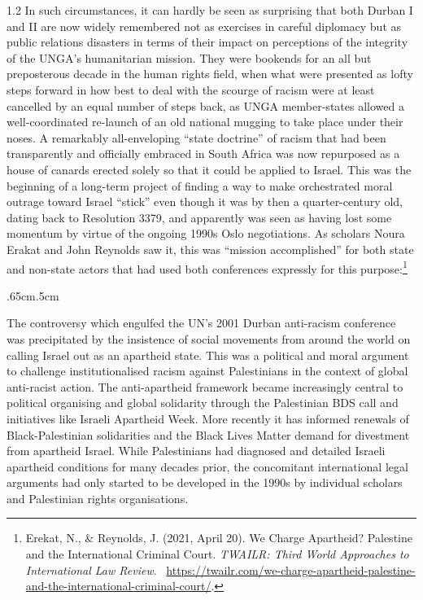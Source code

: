 \documentclass[../unravbook.tex]{subfiles}
\begin{document}
\begin{spacing}{1.2}
In such circumstances, it can hardly be seen as surprising that both Durban I and II are now widely remembered not as exercises in careful diplomacy but as public relations disasters in terms of their impact on perceptions of the integrity of the UNGA's humanitarian mission. They were bookends for an all but preposterous decade in the human rights field, when what were presented as lofty steps forward in how best to deal with the scourge of racism were at least cancelled by an equal number of steps back, as UNGA member-states allowed a well-coordinated re-launch of an old national mugging to take place under their noses. A remarkably all-enveloping ``state doctrine'' of racism that had been transparently and officially embraced in South Africa was now repurposed as a house of canards erected solely so that it could be applied to Israel. This was the beginning of a long-term project of finding a way to make orchestrated moral outrage toward Israel ``stick'' even though it was by then a quarter-century old, dating back to Resolution 3379, and apparently was seen as having lost some momentum by virtue of the ongoing 1990s Oslo negotiations. As scholars Noura Erakat and John Reynolds saw it, this was ``mission accomplished'' for both state and non-state actors that had used both conferences expressly for this purpose:\footnote{Erekat, N., \& Reynolds, J. (2021, April 20). We Charge Apartheid? Palestine and the International Criminal Court. \textit{TWAILR: Third World Approaches to International Law Review}. \ \url{https://twailr.com/we-charge-apartheid-palestine-and-the-international-criminal-court/}.}

\begin{adjustwidth}{.65cm}{.5cm}
   \begin{singlespace}
      The controversy which engulfed the UN's 2001 Durban anti-racism conference was precipitated by the insistence of social movements from around the world on calling Israel out as an apartheid state. This was a political and moral argument to challenge institutionalised racism against Palestinians in the context of global anti-racist action. The anti-apartheid framework became increasingly central to political organising and global solidarity through the Palestinian BDS call and initiatives like Israeli Apartheid Week. More recently it has informed renewals of Black-Palestinian solidarities and the Black Lives Matter demand for divestment from apartheid Israel. While Palestinians had diagnosed and detailed Israeli apartheid conditions for many decades prior, the concomitant international legal arguments had only started to be developed in the 1990s by individual scholars and Palestinian rights organisations.
   \end{singlespace}
\end{adjustwidth}


\end{spacing}
\end{document}

